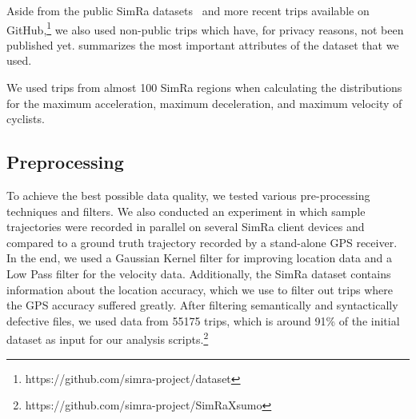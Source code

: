 Aside from the public SimRa datasets~\cite{dataset_simra_set1,dataset_simra_set2, dataset_simra_set3} and more recent trips available on GitHub,\footnote{https://github.com/simra-project/dataset} we also used non-public trips which have, for privacy reasons, not been published yet.
 summarizes the most important attributes of the dataset that we used.

We used trips from almost \num{100} SimRa regions when calculating the distributions for the maximum acceleration, maximum deceleration, and maximum velocity of cyclists.

\subsection{Preprocessing}
\label{subsec:preprocessing_sumo}
To achieve the best possible data quality, we tested various pre-processing techniques and filters.
We also conducted an experiment in which sample trajectories were recorded in parallel on several SimRa client devices and compared to a ground truth trajectory recorded by a stand-alone GPS receiver.
In the end, we used a Gaussian Kernel filter for improving location data and a Low Pass filter for the velocity data.
Additionally, the SimRa dataset contains information about the location accuracy, which we use to filter out trips where the GPS accuracy suffered greatly.
After filtering semantically and syntactically defective files, we used data from \num{55175} trips, which is around \num{91}\% of the initial dataset as input for our analysis scripts.\footnote{https://github.com/simra-project/SimRaX\ac{sumo}}
